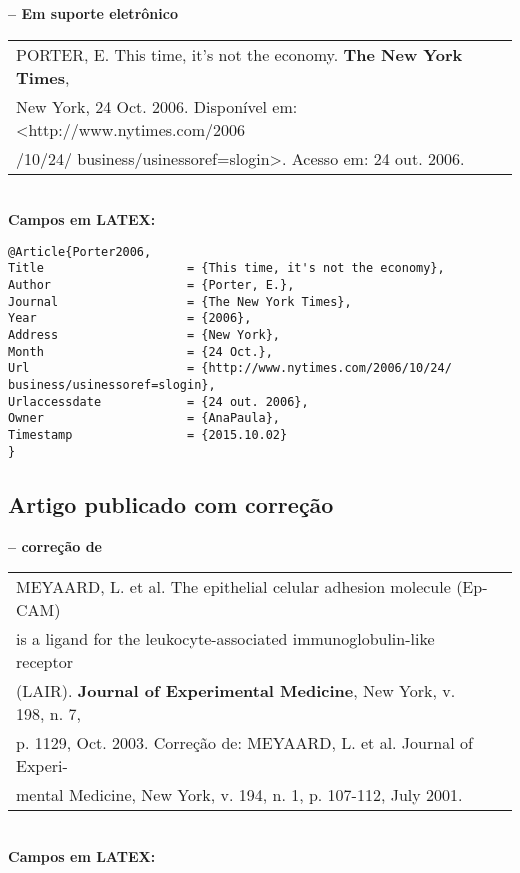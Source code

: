 \textbf{-- Em suporte eletrônico} \\

\begin{tabular}{|l|c|} \hline
PORTER, E. This time, it's not the economy. \textbf{The New York Times}, \\New 
York, 24 Oct. 2006. Disponível em: <http://www.nytimes.com/2006\\/10/24/
business/usinessoref=slogin>. Acesso em: 24 out. 2006. \\\hline
\end{tabular} \\

\textbf{Campos em LATEX:} 

\begin{verbatim}
@Article{Porter2006,
Title                    = {This time, it's not the economy},
Author                   = {Porter, E.},
Journal                  = {The New York Times},
Year                     = {2006},
Address                  = {New York},
Month                    = {24 Oct.},
Url                      = {http://www.nytimes.com/2006/10/24/
business/usinessoref=slogin},
Urlaccessdate            = {24 out. 2006},
Owner                    = {AnaPaula},
Timestamp                = {2015.10.02}
}
\end{verbatim}

\subsection{Artigo publicado com correção}

\textbf{-- correção de} \\

\begin{tabular}{|l|c|} \hline
MEYAARD, L. et al. The epithelial celular adhesion molecule (Ep-CAM)\\
is a ligand for the leukocyte-associated immunoglobulin-like receptor
\\(LAIR). \textbf{Journal of Experimental Medicine}, New York, v. 198, n. 7,\\ 
p.	1129, Oct. 2003. Correção de: MEYAARD, L. et al. Journal of Experi-\\mental Medicine, New York, v. 194, n. 1, p. 107-112, July 2001.\\\hline
\end{tabular} \\

\textbf{Campos em LATEX:} 

